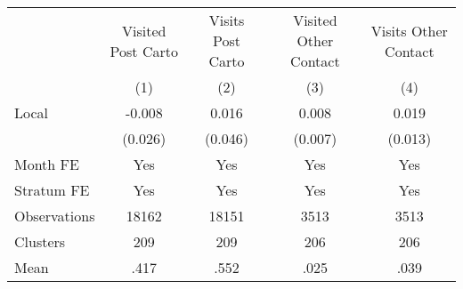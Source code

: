 {
\def\sym#1{\ifmmode^{#1}\else\(^{#1}\)\fi}
\begin{tabular}{l*{4}{c}}
\hline\hline
                &\multicolumn{1}{c}{Visited Post Carto}&\multicolumn{1}{c}{Visits Post Carto}&\multicolumn{1}{c}{Visited Other Contact}&\multicolumn{1}{c}{Visits Other Contact}\\
                &\multicolumn{1}{c}{(1)}         &\multicolumn{1}{c}{(2)}         &\multicolumn{1}{c}{(3)}         &\multicolumn{1}{c}{(4)}         \\
\hline
Local           &   -0.008         &    0.016         &    0.008         &    0.019         \\
                &  (0.026)         &  (0.046)         &  (0.007)         &  (0.013)         \\
Month FE        &      Yes         &      Yes         &      Yes         &      Yes         \\
Stratum FE      &      Yes         &      Yes         &      Yes         &      Yes         \\
\hline
Observations    &    18162         &    18151         &     3513         &     3513         \\
Clusters        &      209         &      209         &      206         &      206         \\
Mean            &     .417         &     .552         &     .025         &     .039         \\
\hline\hline
\end{tabular}
}
